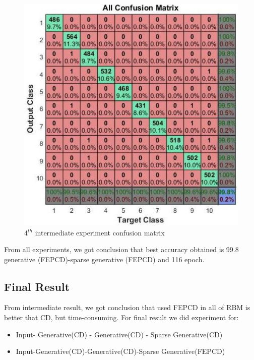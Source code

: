 \documentclass[conference]{IEEEtran}
\begin{document}
\begin{figure}[H]
	\centering
	\includegraphics[width=.25\textwidth]{pics/fig9.jpg}
	\caption{4$^{th}$ intermediate experiment confusion matrix}
	\label{fig9}
\end{figure}

From all experiments, we got conclusion that best accuracy obtained is 99.8%
generative (FEPCD)-sparse generative (FEPCD) and 116
epoch.
\subsection{Final Result}
From intermediate result, we got conclusion that used
FEPCD in all of RBM is better that CD, but time-consuming. For final result we did experiment for:
\begin{itemize}
	\item Input- Generative(CD) - Generative(CD) - Sparse
	Generative(CD)
	\item Input-Generative(CD)-Generative(CD)-Sparse
	Generative(FEPCD)
\end{itemize}
\end{document}
